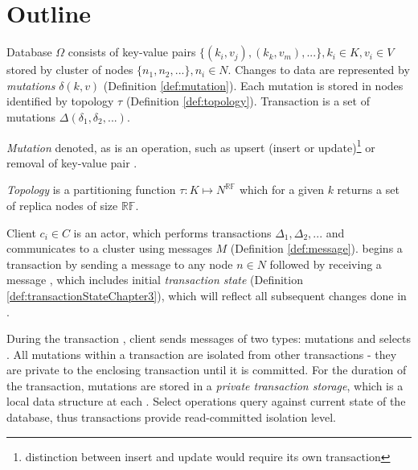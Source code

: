 

\section{Outline}
Database $\Omega$ consists of key-value pairs $\{(k_{i},v_{j}), (k_{k},v_{m}),...\}, k_i\in\mathit{K}, v_i\in\mathit{V}$ stored by cluster of nodes $\{n_1, n_2, ...\}, n_i\in\mathit{N}$.
Changes to data are represented by \emph{mutations} $\delta(k,v)$ (Definition \ref{def:mutation}). 
Each mutation is stored in nodes identified by topology $\tau$ (Definition \ref{def:topology}).
Transaction is a set of mutations $\Delta(\delta_{1}, \delta_{2}, ...)$.

\begin{definition}
  \label{def:mutation}
  \emph{Mutation} denoted, as  is an operation, such as upsert (insert or update)\footnote{distinction between insert and update would require its own transaction} or removal of key-value pair \kv. 
\end{definition}

\begin{definition}
\label{def:topology}
\emph{Topology} is a partitioning function $\tau:\mathit{K} \mapsto \mathit{N}^{\mathbb{RF}}$ which for a given $k$ returns a set of replica nodes of size $\mathbb{RF}$. 
\end{definition}


Client $c_{i}\in\mathit{C}$ is an actor, which performs transactions $\Delta_{1}, \Delta_{2}, ...$ and communicates to a cluster \nodes using messages $\mathit{M}$ (Definition \ref{def:message}). \client begins a transaction \transaction by sending a message \beginTransactionMessage to any node $n\in\mathit{N}$ followed by receiving a message 
\initialTxStateMessage, which includes 
initial \emph{transaction state} (Definition \ref{def:transactionStateChapter3}), which will reflect all subsequent changes done in \transaction.

During the transaction \transaction, client \client sends messages of two types:
 mutations and selects \selectMessage. 
 All mutations within a transaction \transaction are isolated from other transactions - they are private to the enclosing transaction until it is committed.
For the duration of the transaction,
mutations are stored in a \emph{private transaction storage}, which is a local data structure at each . Select operations query against current state of the database, thus transactions provide read-committed isolation level.

